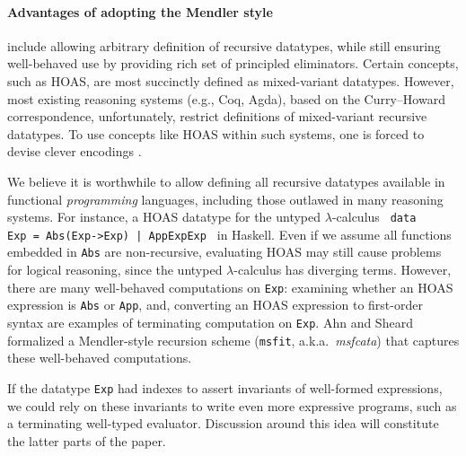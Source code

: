\documentclass[a4paper]{easychair} %
\newcommand{\eg}[0]{{e.g.}}
\newcommand{\aka}[0]{{a.k.a.}}
\newcommand{\msfit}[0]{\texttt{msfit}}
\begin{document}
\paragraph{Advantages of adopting the Mendler style\!\!\!}
include allowing arbitrary definition of recursive datatypes, while still 
ensuring well-behaved use by providing rich set of principled eliminators.
Certain concepts, such as HOAS, are most succinctly defined as
mixed-variant datatypes. However, most existing reasoning systems
(\eg, Coq, Agda), based on the Curry--Howard correspondence, unfortunately,
restrict definitions of
mixed-variant recursive datatypes.
To use concepts like HOAS within such systems,
one is forced to devise clever encodings \cite{PHOAS}.

We believe it is worthwhile to allow defining all recursive datatypes
available in functional \emph{programming} languages, including those outlawed
in many reasoning systems. For instance, a HOAS datatype for
the untyped $\lambda$-calculus
{\small\texttt{\,data Exp~=~Abs\;(Exp\;->\;Exp)~|~App\;Exp\;Exp\,}} in Haskell.
Even if we assume all functions embedded in \texttt{Abs} are non-recursive,
evaluating HOAS may still cause problems for logical reasoning,
since the untyped $\lambda$-calculus has diverging terms. However, there are
many well-behaved computations on \texttt{Exp}: examining whether
an HOAS expression is \texttt{Abs} or \texttt{App}, and, converting an HOAS expression
to first-order syntax are examples of terminating computation on \texttt{Exp}.
Ahn and Sheard \cite{AhnShe11} formalized a Mendler-style recursion scheme
(\msfit, \aka\ \textit{msfcata}) that captures these well-behaved computations.

If the datatype \texttt{Exp} had indexes to assert invariants of
well-formed expressions, we could rely on these invariants to write
even more expressive programs, such as a terminating well-typed evaluator.
Discussion around this idea will constitute the latter parts of the paper.
\vspace*{-1ex}
\end{document}
